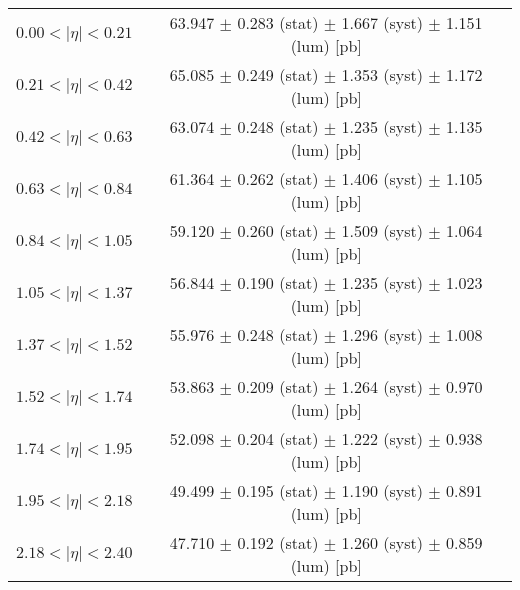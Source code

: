 \begin{tabular}{lc}
\hline
$0.00 < |\eta| <0.21$          & 63.947 $\pm$ 0.283 (stat) $\pm$ 1.667 (syst) $\pm$ 1.151 (lum) [pb]  \\
$0.21 < |\eta| <0.42$          & 65.085 $\pm$ 0.249 (stat) $\pm$ 1.353 (syst) $\pm$ 1.172 (lum) [pb]  \\
$0.42 < |\eta| <0.63$          & 63.074 $\pm$ 0.248 (stat) $\pm$ 1.235 (syst) $\pm$ 1.135 (lum) [pb]  \\
$0.63 < |\eta| <0.84$          & 61.364 $\pm$ 0.262 (stat) $\pm$ 1.406 (syst) $\pm$ 1.105 (lum) [pb]  \\
$0.84 < |\eta| <1.05$          & 59.120 $\pm$ 0.260 (stat) $\pm$ 1.509 (syst) $\pm$ 1.064 (lum) [pb]  \\
$1.05 < |\eta| <1.37$          & 56.844 $\pm$ 0.190 (stat) $\pm$ 1.235 (syst) $\pm$ 1.023 (lum) [pb]  \\
$1.37 < |\eta| <1.52$          & 55.976 $\pm$ 0.248 (stat) $\pm$ 1.296 (syst) $\pm$ 1.008 (lum) [pb]  \\
$1.52 < |\eta| <1.74$          & 53.863 $\pm$ 0.209 (stat) $\pm$ 1.264 (syst) $\pm$ 0.970 (lum) [pb]  \\
$1.74 < |\eta| <1.95$          & 52.098 $\pm$ 0.204 (stat) $\pm$ 1.222 (syst) $\pm$ 0.938 (lum) [pb]  \\
$1.95 < |\eta| <2.18$          & 49.499 $\pm$ 0.195 (stat) $\pm$ 1.190 (syst) $\pm$ 0.891 (lum) [pb]  \\
$2.18 < |\eta| <2.40$          & 47.710 $\pm$ 0.192 (stat) $\pm$ 1.260 (syst) $\pm$ 0.859 (lum) [pb]  \\
\hline
\end{tabular}
